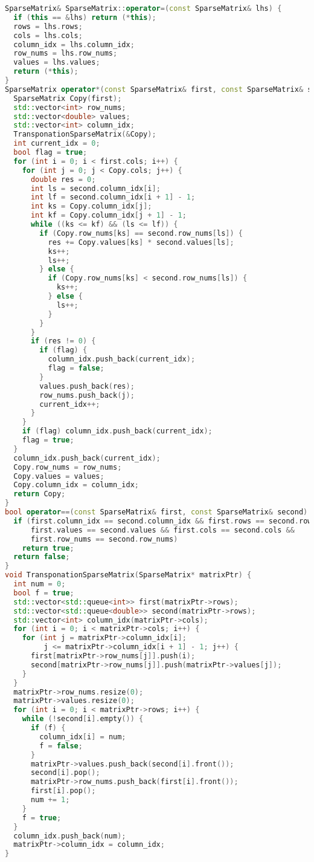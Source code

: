 \documentclass{report}
\begin{document}
\begin{lstlisting}[language=C++]
SparseMatrix& SparseMatrix::operator=(const SparseMatrix& lhs) {
  if (this == &lhs) return (*this);
  rows = lhs.rows;
  cols = lhs.cols;
  column_idx = lhs.column_idx;
  row_nums = lhs.row_nums;
  values = lhs.values;
  return (*this);
}
SparseMatrix operator*(const SparseMatrix& first, const SparseMatrix& second) {
  SparseMatrix Copy(first);
  std::vector<int> row_nums;
  std::vector<double> values;
  std::vector<int> column_idx;
  TransponationSparseMatrix(&Copy);
  int current_idx = 0;
  bool flag = true;
  for (int i = 0; i < first.cols; i++) {
    for (int j = 0; j < Copy.cols; j++) {
      double res = 0;
      int ls = second.column_idx[i];
      int lf = second.column_idx[i + 1] - 1;
      int ks = Copy.column_idx[j];
      int kf = Copy.column_idx[j + 1] - 1;
      while ((ks <= kf) && (ls <= lf)) {
        if (Copy.row_nums[ks] == second.row_nums[ls]) {
          res += Copy.values[ks] * second.values[ls];
          ks++;
          ls++;
        } else {
          if (Copy.row_nums[ks] < second.row_nums[ls]) {
            ks++;
          } else {
            ls++;
          }
        }
      }
      if (res != 0) {
        if (flag) {
          column_idx.push_back(current_idx);
          flag = false;
        }
        values.push_back(res);
        row_nums.push_back(j);
        current_idx++;
      }
    }
    if (flag) column_idx.push_back(current_idx);
    flag = true;
  }
  column_idx.push_back(current_idx);
  Copy.row_nums = row_nums;
  Copy.values = values;
  Copy.column_idx = column_idx;
  return Copy;
}
bool operator==(const SparseMatrix& first, const SparseMatrix& second) {
  if (first.column_idx == second.column_idx && first.rows == second.rows &&
      first.values == second.values && first.cols == second.cols &&
      first.row_nums == second.row_nums)
    return true;
  return false;
}
void TransponationSparseMatrix(SparseMatrix* matrixPtr) {
  int num = 0;
  bool f = true;
  std::vector<std::queue<int>> first(matrixPtr->rows);
  std::vector<std::queue<double>> second(matrixPtr->rows);
  std::vector<int> column_idx(matrixPtr->cols);
  for (int i = 0; i < matrixPtr->cols; i++) {
    for (int j = matrixPtr->column_idx[i];
         j <= matrixPtr->column_idx[i + 1] - 1; j++) {
      first[matrixPtr->row_nums[j]].push(i);
      second[matrixPtr->row_nums[j]].push(matrixPtr->values[j]);
    }
  }
  matrixPtr->row_nums.resize(0);
  matrixPtr->values.resize(0);
  for (int i = 0; i < matrixPtr->rows; i++) {
    while (!second[i].empty()) {
      if (f) {
        column_idx[i] = num;
        f = false;
      }
      matrixPtr->values.push_back(second[i].front());
      second[i].pop();
      matrixPtr->row_nums.push_back(first[i].front());
      first[i].pop();
      num += 1;
    }
    f = true;
  }
  column_idx.push_back(num);
  matrixPtr->column_idx = column_idx;
}


\end{lstlisting}
\end{document}
